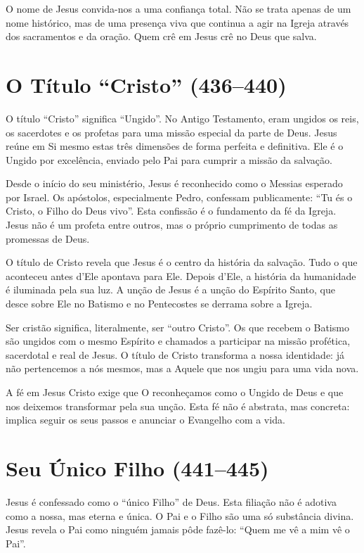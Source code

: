 O nome de Jesus convida-nos a uma confiança total. Não se trata apenas de um nome histórico, mas de uma presença viva que continua a agir na Igreja através dos sacramentos e da oração. Quem crê em Jesus crê no Deus que salva.

\section{O Título ``Cristo'' (436--440)}

O título ``Cristo'' significa ``Ungido''. No Antigo Testamento, eram ungidos os reis, os sacerdotes e os profetas para uma missão especial da parte de Deus. Jesus reúne em Si mesmo estas três dimensões de forma perfeita e definitiva. Ele é o Ungido por excelência, enviado pelo Pai para cumprir a missão da salvação.

Desde o início do seu ministério, Jesus é reconhecido como o Messias esperado por Israel. Os apóstolos, especialmente Pedro, confessam publicamente: ``Tu és o Cristo, o Filho do Deus vivo''. Esta confissão é o fundamento da fé da Igreja. Jesus não é um profeta entre outros, mas o próprio cumprimento de todas as promessas de Deus.

O título de Cristo revela que Jesus é o centro da história da salvação. Tudo o que aconteceu antes d’Ele apontava para Ele. Depois d’Ele, a história da humanidade é iluminada pela sua luz. A unção de Jesus é a unção do Espírito Santo, que desce sobre Ele no Batismo e no Pentecostes se derrama sobre a Igreja.

Ser cristão significa, literalmente, ser ``outro Cristo''. Os que recebem o Batismo são ungidos com o mesmo Espírito e chamados a participar na missão profética, sacerdotal e real de Jesus. O título de Cristo transforma a nossa identidade: já não pertencemos a nós mesmos, mas a Aquele que nos ungiu para uma vida nova.

A fé em Jesus Cristo exige que O reconheçamos como o Ungido de Deus e que nos deixemos transformar pela sua unção. Esta fé não é abstrata, mas concreta: implica seguir os seus passos e anunciar o Evangelho com a vida.

\section{Seu Único Filho (441--445)}

Jesus é confessado como o ``único Filho'' de Deus. Esta filiação não é adotiva como a nossa, mas eterna e única. O Pai e o Filho são uma só substância divina. Jesus revela o Pai como ninguém jamais pôde fazê-lo: ``Quem me vê a mim vê o Pai''.


